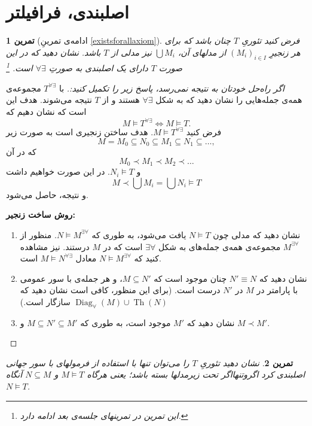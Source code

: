 \documentclass[12pt,a4paper]{report}
\theoremstyle{colorhead}
\newtheorem{tam}{تمرین}
\DeclareMathOperator{\Th}{Th}
\DeclareMathOperator{\diag}{Diag}
\begin{document}
\section{اصلبندی‌، فرافیلتر}
\begin{tam}[ادامه‌ی تمرینِ
\ref{existsforallaxiom}]
\label{forallexists}
فرض کنید تئوریِ 
$T$
چنان باشد که برای هر زنجیرِ
$(M_i)_{i\in I}$
از مدلهای آن، 
$\bigcup M_i$
نیز مدلی از
$T$
باشد. نشان دهید که در این صورت 
$T$
دارای یک اصلبندی به صورتِ
$\forall\exists$
است. 
\footnote{این تمرین در تمرینهای جلسه‌ی بعد ادامه دارد.}
\end{tam}
\begin{proof}[اگر راه‌حل خودتان به نتیجه نمی‌رسد، پاسخ زیر را تکمیل کنید:]
با
$T^{\forall \exists}$
مجموعه‌ی همه‌ی جمله‌هایی را نشان دهید که به شکل
$\forall \exists$
هستند و 
از
$T$
نتیجه می‌شوند. هدف این است که نشان دهیم که
\[
M\models T^{\forall\exists}\Leftrightarrow M\models T.
\]
فرض کنید
$M\models T^{\forall \exists}$.
هدف ساختن زنجیری است به صورت زیر
\[
M=M_0\subseteq N_0\subseteq M_1\subseteq N_1\subseteq \ldots,
\]
که در آن
\[
M_0\prec M_1\prec M_2\prec \ldots
\]
و 
$N_i\models T$.
در این صورت خواهیم داشت
\[
M\prec \bigcup M_i=\bigcup N_i\models T\]
و نتیجه، حاصل می‌شود.
\par \noindent
\textbf{روش ساخت زنجیر:}
\begin{enumerate}
\item 
نشان دهید که مدلی چون
$N\models T$
یافت می‌شود، به طوری که
$N\models M^{\exists\forall}$.
منظور از
$M^{\exists\forall}$
مجموعه‌ی همه‌ی جمله‌های به شکل
$\exists\forall$
است که در
$M$
درستند. نیز مشاهده کنید که
$N\models M^{\exists \forall}$
معادل
$M\models N^{\forall \exists}$
است.
\item 
نشان دهید که
$N'\equiv N$
چنان موجود است که
$M\subseteq N'$، 
و هر جمله‌ی با سور عمومی با پارامتر در
$M$
در
$N'$
درست است. 
(برای این منظور، کافی است نشان دهید که 
$\diag_{\forall }(M) \cup \Th(N)$
سازگار است.) 
\item
نشان دهید که 
$M'$
موجود است،‌ به طوری که
$M\subseteq N'\subseteq M'$
و
$M\prec M'$.
\end{enumerate}
\end{proof}
\begin{tam}
\label{zirsaxt}
نشان دهید تئوریِ
$T$
را می‌توان تنها با استفاده از فرمولهای با سور جهانی اصلبندی کرد اگروتنهااگر
تحت زیرمدلها بسته باشد؛ یعنی هرگاه
$M\models T$
و
$N\subseteq M$
آنگاه
$N\models T$.	
\end{tam}
\par 
{}
\end{document}
